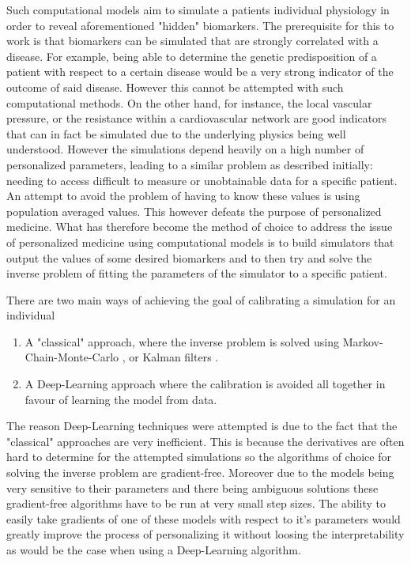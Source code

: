\documentclass[a4paper, oneside]{discothesis}
\begin{document}
Such computational models aim to simulate a patients individual physiology in order to reveal aforementioned "hidden" biomarkers.
The prerequisite for this to work is that biomarkers can be simulated that are strongly correlated with a disease.
For example, being able to determine the genetic predisposition of a patient with respect to a certain disease would be a very strong indicator of the outcome of said disease.
However this cannot be attempted with such computational methods.
On the other hand, for instance, the local vascular pressure, or the resistance within a cardiovascular network are good indicators that can in fact be simulated due to the underlying physics being well understood.
However the simulations depend heavily on a high number of personalized parameters, leading to a similar problem as described initially: needing to access difficult to measure or unobtainable data for a specific patient.
An attempt to avoid the problem of having to know these values is using population averaged values.
This however defeats the purpose of personalized medicine.
What has therefore become the method of choice to address the issue of personalized medicine using computational models is to build simulators that output the values of some desired biomarkers and to then try and solve the inverse problem of fitting the parameters of the simulator to a specific patient.

There are two main ways of achieving the goal of calibrating a simulation for an individual
\begin{enumerate}
	\item A "classical" approach, where the inverse problem is solved using Markov-Chain-Monte-Carlo \cite{melis2017gaussian}, or Kalman filters \cite{manganotti2022modeling}.
	\item A Deep-Learning approach where the calibration is avoided all together in favour of learning the model from data. \cite{kissas2020machine,arzani2022machine}
\end{enumerate}
The reason Deep-Learning techniques were attempted is due to the fact that the "classical" approaches are very inefficient.
This is because the derivatives are often hard to determine for the attempted simulations so the algorithms of choice for solving the inverse problem are gradient-free. 
Moreover due to the models being very sensitive to their parameters and there being ambiguous solutions \cite{nolte2022inverse,quick2001infinite} these gradient-free algorithms have to be run at very small step sizes. \cite{taylor2009patient,tuccio2022parameter,marsden2014optimization,mineroff2019optimization,bozkurt2022patient}
The ability to easily take gradients of one of these models with respect to it's parameters would greatly improve the process of personalizing it without loosing the interpretability as would be the case when using a Deep-Learning algorithm.
\end{document}
